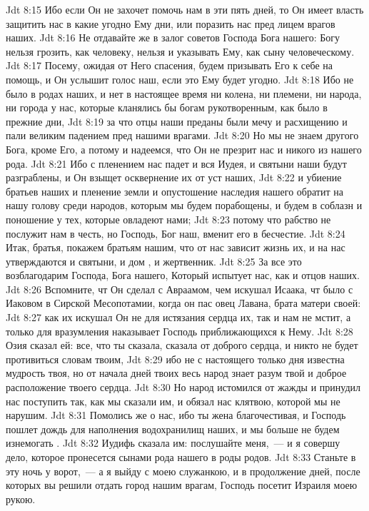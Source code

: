 \vs Jdt 8:15 Ибо если Он не захочет помочь нам в эти пять дней, то Он имеет власть защитить нас в какие угодно Ему дни, или поразить нас пред лицем врагов наших.
\vs Jdt 8:16 Не отдавайте же в залог советов Господа Бога нашего: Богу нельзя грозить, как человеку, нельзя и указывать Ему, как сыну человеческому.
\vs Jdt 8:17 Посему, ожидая от Него спасения, будем призывать Его к себе на помощь, и Он услышит голос наш, если это Ему будет угодно.
\vs Jdt 8:18 Ибо не было в родах наших, и нет в настоящее время ни колена, ни племени, ни народа, ни города у нас, которые кланялись бы богам рукотворенным, как было в прежние дни,
\vs Jdt 8:19 за что отцы наши преданы были мечу и расхищению и пали великим падением пред нашими врагами.
\vs Jdt 8:20 Но мы не знаем другого Бога, кроме Его, а потому и надеемся, что Он не презрит нас и никого из нашего рода.
\vs Jdt 8:21 Ибо с пленением нас падет и вся Иудея, и святыни наши будут разграблены, и Он взыщет осквернение их от уст наших,
\vs Jdt 8:22 и убиение братьев наших и пленение земли и опустошение наследия нашего обратит на нашу голову среди народов, которым мы будем порабощены, и будем в соблазн и поношение у тех, которые овладеют нами;
\vs Jdt 8:23 потому что рабство не послужит нам в честь, но Господь, Бог наш, вменит его в бесчестие.
\vs Jdt 8:24 Итак, братья, покажем братьям нашим, что от нас зависит жизнь их, и на нас утверждаются и святыни, и дом , и жертвенник.
\vs Jdt 8:25 За все это возблагодарим Господа, Бога нашего, Который испытует нас, как и отцов наших.
\vs Jdt 8:26 Вспомните, чт Он сделал с Авраамом, чем искушал Исаака, чт было с Иаковом в Сирской Месопотамии, когда он пас овец Лавана, брата матери своей:
\vs Jdt 8:27 как их искушал Он не для истязания сердца их, так и нам не мстит, а только для вразумления наказывает Господь приближающихся к Нему.
\vs Jdt 8:28 Озия сказал ей: все, что ты сказала, сказала от доброго сердца, и никто не будет противиться словам твоим,
\vs Jdt 8:29 ибо не с настоящего только дня известна мудрость твоя, но от начала дней твоих весь народ знает разум твой и доброе расположение твоего сердца.
\vs Jdt 8:30 Но народ истомился от жажды и принудил нас поступить так, как мы сказали им, и обязал нас клятвою, которой мы не нарушим.
\vs Jdt 8:31 Помолись же о нас, ибо ты жена благочестивая, и Господь пошлет дождь для наполнения водохранилищ наших, и мы больше не будем изнемогать .
\vs Jdt 8:32 Иудифь сказала им: послушайте меня,~--- и я совершу дело, которое пронесется сынами рода нашего в роды родов.
\vs Jdt 8:33 Станьте в эту ночь у ворот,~--- а я выйду с моею служанкою, и в продолжение дней, после которых вы решили отдать город нашим врагам, Господь посетит Израиля моею рукою.

